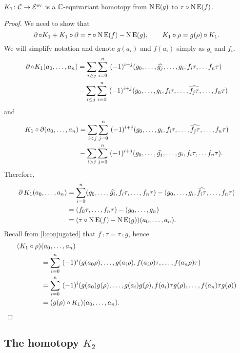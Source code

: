 \begin{lemma}\label{l:K1}
	$K_1 \colon \mathcal{C} \to \mathcal{E}^{\mathrm{ev}}$ is a $\mathbb{C}$-equivariant homotopy from $\operatorname{N}\operatorname{E}(g)$ to $\tau \mathbin{\circ} \operatorname{N}\operatorname{E}(f)$.
\end{lemma}

\begin{proof}
	We need to show that
	\[
	\operatorname{\partial} \mathbin{\circ} K_1 + K_1 \mathbin{\circ} \operatorname{\partial} = \tau \mathbin{\circ} \operatorname{N}\operatorname{E}(f) - \operatorname{N}\operatorname{E}(g),
	\qquad
	K_1 \mathbin{\circ} \rho = g(\rho) \mathbin{\circ} K_1.
	\]
	We will simplify notation and denote $g(a_i)$ and $f(a_i)$ simply as $g_i$ and $f_i$.
	\begin{align*}
		\operatorname{\partial} \mathbin{\circ} K_1(a_0,\dots,a_n) &=
		\sum_{i \geq j} \sum_{i=0}^n \ (-1)^{i+j} (g_0, \dots, \widehat{g_j}, \dots, g_i, f_i\tau, \dots f_n \tau) \\ & -
		\sum_{i \leq j} \sum_{i=0}^n \ (-1)^{i+j} (g_0, \dots, g_i, f_i \tau, \dots, \widehat{f_j\tau}, \dots, f_n \tau)
	\end{align*}
	and
	\begin{align*}
		K_1 \mathbin{\circ} \operatorname{\partial}(a_0,\dots,a_n) &=
		\sum_{i<j} \sum_{j=0}^n \ (-1)^{i+j} (g_0, \dots, g_i, f_i\tau, \dots, \widehat{f_j\tau}, \dots, f_n \tau) \\ & -
		\sum_{i > j} \sum_{j=0}^n \ (-1)^{i+j} (g_0, \dots, \widehat{g_j}, \dots, g_i, f_i\tau, \dots f_n \tau).
	\end{align*}
	Therefore,
	\begin{align*}
		\operatorname{\partial} K_1(a_0,\dots,a_n) &=
		\sum_{i=0}^n (g_0, \dots, \widehat{g_i}, f_i\tau, \dots, f_n \tau) -
		(g_0, \dots, g_i, \widehat{f_i\tau}, \dots, f_n \tau) \\ &=
		(f_0\tau, \dots, f_n\tau) - (g_0, \dots, g_n) \\ &=
		(\tau \mathbin{\circ} \operatorname{N}\operatorname{E}(f) - \operatorname{N}\operatorname{E}(g))(a_0,\dots,a_n).
	\end{align*}
	Recall from \cref{l:conjugated} that $f \comp \tau = \tau \comp g$, hence
	\begin{align*}
		(K_1 \mathbin{\circ} \rho) &(a_0,\dots,a_n) \\ &=
		\sum_{i=0}^n \ (-1)^i (g(a_0 \rho), \dots, g(a_i\rho), f(a_i\rho)\tau, \dots, f(a_n\rho) \tau) \\ &=
		\sum_{i=0}^n \ (-1)^i (g(a_0) g(\rho), \dots, g(a_i)g(\rho), f(a_i)\tau g(\rho), \dots, f(a_n)\tau g(\rho)) \\ &=
		(g(\rho) \mathbin{\circ} K_1) (a_0,\dots,a_n).\qedhere
	\end{align*}
\end{proof}

\subsection{The homotopy $K_2$}

